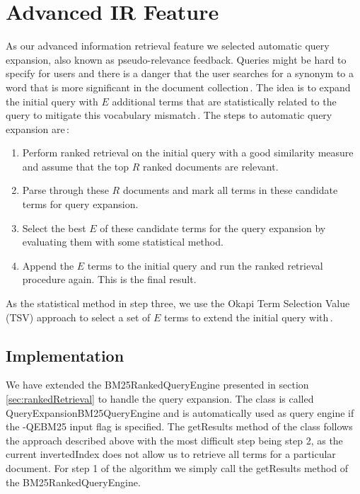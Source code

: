 
\section{Advanced IR Feature}
\label{sec:advancedIRFeature}
As our advanced information retrieval feature we selected automatic query expansion, also known as pseudo-relevance feedback. Queries might be hard to specify for users and there is a danger that the user searches for a synonym to a word that is more significant in the document collection\,\cite{billerbeckzobel04}. The idea is to expand the initial query with $E$ additional terms that are statistically related to the query to mitigate this vocabulary mismatch\,\cite{billerbeckzobel04}. The steps to automatic query expansion are\,\cite{scholer13}: 

\begin{enumerate}
	\item Perform ranked retrieval on the initial query with a good similarity measure and assume that the top $R$ ranked documents are relevant.
	\item Parse through these $R$ documents and mark all terms in these candidate terms for query expansion.
	\item Select the best $E$ of these candidate terms for the query expansion by evaluating them with some statistical method.
	\item Append the $E$ terms to the initial query and run the ranked retrieval procedure again. This is the final result.
\end{enumerate}

As the statistical method in step three, we use the Okapi Term Selection Value (TSV) approach to select a set of $E$ terms to extend the initial query with\,\cite{billerbeckzobel04}.

\subsection*{Implementation}
We have extended the BM25RankedQueryEngine presented in section \ref{sec:rankedRetrieval} to handle the query expansion. The class is called QueryExpansionBM25QueryEngine and is automatically used as query engine if the -QEBM25 input flag is specified. The getResults method of the class follows the approach described above with the most difficult step being step 2, as the current invertedIndex does not allow us to retrieve all terms for a particular document. For step 1 of the algorithm we simply call the getResults method of the BM25RankedQueryEngine.

